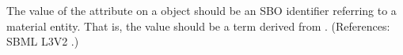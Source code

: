 The value of the attribute  on a \Species object should be
an SBO identifier referring to a material entity.  That is, the value
should be a term derived from \sbomaterialentity.  (References: SBML L3V2
.)
